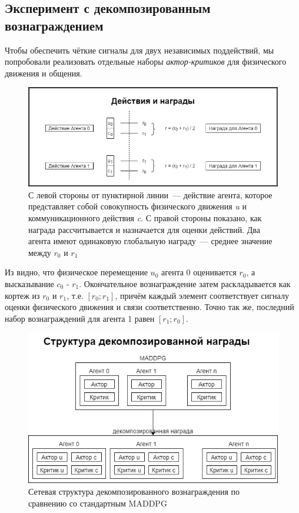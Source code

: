 \subsection{Эксперимент с декомпозированным вознаграждением}

Чтобы обеспечить чёткие сигналы для двух независимых поддействий, мы попробовали реализовать отдельные наборы \textit{актор-критиков} для физического движения и общения.

\begin{figure}[ht!]
    \center
    \includegraphics [scale=0.60] {my_folder/images/ch4/actions_and_rewards.png}
    \caption{С левой стороны от пунктирной линии~--- действие агента, которое представляет собой совокупность физического движения \textit{u} и коммуникационного действия \textit{c}. С правой стороны показано, как награда рассчитывается и назначается для оценки действий. Два агента имеют одинаковую глобальную награду~--- среднее значение между $r_0$ и $r_1$}
    \label{fig:action-reward}
\end{figure}

Из  видно, что физическое перемещение $u_0$ агента 0 оценивается $r_0$, а высказывание $c_0$ - $r_1$. Окончательное вознаграждение затем раскладывается как кортеж из $r_0$ и $r_1$, т.е. $[r_0; r_1]$, причём каждый элемент соответствует сигналу оценки физического движения и связи соответственно. Точно так же, последний набор вознаграждений для агента 1 равен $[r_1; r_0]$.

\begin{figure}[ht!]
    \center
    \includegraphics [scale=0.60] {my_folder/images/ch4/decomposed_reward_structure.png}
    \caption{Сетевая структура декомпозированного вознаграждения по сравнению со стандартным MADDPG}
    \label{fig:decomposed-reward-structure}
\end{figure}

